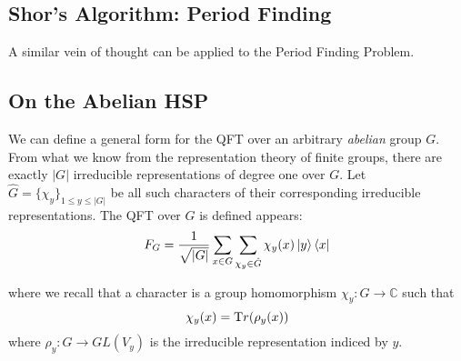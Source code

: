 \documentclass{../quantum.tex}
\begin{document}
\subsection{Shor's Algorithm: Period Finding}
A similar vein of thought can be applied to the Period Finding Problem.


\subsection{On the Abelian HSP}

We can define a general form for the QFT over an arbitrary \textit{abelian} group $G$. From what we know from the representation theory of finite groups, there are exactly $|G|$ irreducible representations of degree one over $G$. Let $\hat{G} = \{\chi_y\}_{1 \leq y \leq |G|}$ be all such characters of their corresponding irreducible representations. The QFT over $G$ is defined appears:
%
\begin{equation}
  F_{G} = \frac{1}{\sqrt{|G|}}\sum_{x \in G}\sum_{\chi_y \in \hat{G}} \chi_y(x) \ket{y}\bra{x}
\end{equation}

where we recall that a character is a group homomorphism $\chi_y: G \rightarrow \mathbb{C}$ such that
$$ \chi_y(x) = {\text Tr}(\rho_y(x)) $$ where $\rho_y : G \rightarrow GL(V_y)$ is the irreducible representation indiced by $y$.
\end{document}
